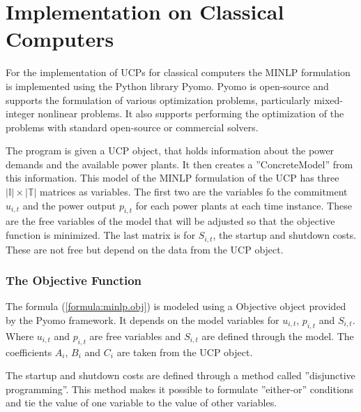 \section{Implementation on Classical Computers}

For the implementation of UCPs for classical computers
the MINLP formulation is implemented using the Python library Pyomo.
Pyomo is open-source and supports the formulation of various optimization problems,
particularly mixed-integer nonlinear problems.
It also supports performing the optimization of the problems
with standard open-source or commercial solvers.
\cite{hart2011pyomo}

The program is given a UCP object, that holds information
about the power demands and the available power plants.
It then creates a ''ConcreteModel'' from this information.
This model of the MINLP formulation of the UCP
has three $| \mathbb{I} | \times | \mathbb{T} |$ matrices as variables.
The first two are the variables fo the commitment $u_{i, t}$
and the power output $p_{i, t}$ for each power plants at each time instance.
These are the free variables of the model that will be adjusted so that the objective function is minimized.
The last matrix is for $S_{i, t}$, the startup and shutdown costs.
These are not free but depend on the data from the UCP object.

\subsubsection{The Objective Function}

The formula (\ref{formula:minlp.obj}) is modeled using a Objective object provided by the Pyomo framework.
It depends on the model variables for $u_{i, t}$, $p_{i, t}$ and $S_{i, t}$.
Where $u_{i, t}$ and $p_{i, t}$ are free variables and $S_{i, t}$ are defined through the model.
The coefficients $A_i$, $B_i$ and $C_i$ are taken from the UCP object.

The startup and shutdown costs are defined through a method called ''disjunctive programming''.
This method makes it possible to formulate ''either-or'' conditions
and tie the value of one variable to the value of other variables.
\cite{Balas1983}

